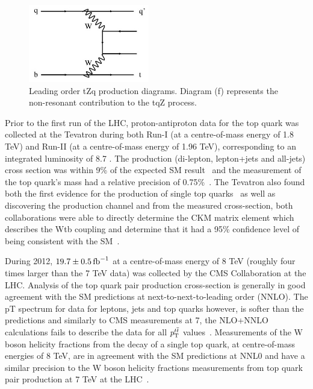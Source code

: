 \begin{figure}[p]
\includegraphics[width=0.47\textwidth]{figs/top-physics/tZq_feyn6.jpg}
\caption{Leading order tZq production diagrams. Diagram (f) represents the non-resonant contribution to the tqZ process.}
\label{fig:feyn_tZq}
\end{figure}

Prior to the first run of the LHC, proton-antiproton data for the top quark was collected at the Tevatron during both Run-I (at a centre-of-mass energy of 1.8 TeV) and Run-II (at a centre-of-mass energy of 1.96 TeV), corresponding to an integrated luminosity of 8.7 \fbinv.
The \ttbar production (di-lepton, lepton+jets and all-jets) cross section was within 9\% of the expected SM result~\cite{Lister:2008it} and the measurement of the top quark’s mass had a relative precision of 0.75\%~\cite{Group:2009ad}.
The Tevatron also found both the first evidence for the production of single top quarks~\cite{Abazov:2006gd} as well as discovering the production channel and from the measured cross-section, both collaborations were able to directly determine the CKM matrix element which describes the Wtb coupling and determine that it had a 95\% confidence level of being consistent with the SM~\cite{Aaltonen:2009jj}.

During 2012, $19.7\pm0.5 \mbox{\ensuremath{\,\text{fb}^\text{$-$1}}}$ at a centre-of-mass energy of 8 TeV (roughly four times larger than the 7 TeV data) was collected by the CMS Collaboration at the LHC. 
Analysis of the top quark pair production cross-section is generally in good agreement with the SM predictions at next-to-next-to-leading order (NNLO). 
The pT spectrum for data for leptons, jets and top quarks however, is softer than the predictions and similarly to CMS measurements at 7\TeV, the NLO+NNLO calculations fails to describe the data for all $p_{\mathrm{T}}^{t\overline{t}}$ values~\cite{Khachatryan:2015oqa}. 
Measurements of the W boson helicity fractions from the decay of a single top quark, at centre-of-mass energies of 8 TeV, are in agreement with the SM predictions at NNL0  and have a similar precision to the W boson helicity fractions measurements from top quark pair production at 7 TeV at the LHC~\cite{Khachatryan:2014vma}.

